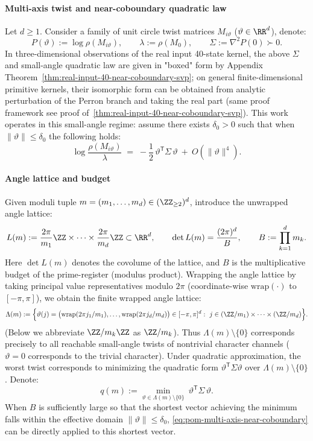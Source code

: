 \paragraph{Multi-axis twist and near-coboundary quadratic law}
Let $d\ge 1$.
Consider a family of unit circle twist matrices $M_{i\vartheta}$ ($\vartheta\in\RR^d$), denote:
\[
P(\vartheta):=\log\rho(M_{i\vartheta}),\qquad \lambda:=\rho(M_{0}),\qquad \Sigma:=\nabla^2P(0)\succ 0.
\]
In three-dimensional observations of the real input 40-state kernel, the above $\Sigma$ and small-angle quadratic law are given in "boxed" form by Appendix Theorem~\ref{thm:real-input-40-near-coboundary-svp}; on general finite-dimensional primitive kernels, their isomorphic form can be obtained from analytic perturbation of the Perron branch and taking the real part (same proof framework see proof of~\ref{thm:real-input-40-near-coboundary-svp}).
This work operates in this small-angle regime: assume there exists $\delta_0>0$ such that when $\|\vartheta\|\le \delta_0$ the following holds:
\begin{equation}\label{eq:pom-multi-axis-near-coboundary}
\log\frac{\rho(M_{i\vartheta})}{\lambda}
\;=\;
-\frac12\,\vartheta^{\mathsf T}\Sigma\,\vartheta\ +\ O(\|\vartheta\|^4).
\end{equation}

\paragraph{Angle lattice and budget}
Given moduli tuple $m=(m_1,\dots,m_d)\in(\ZZ_{\ge 2})^d$, introduce the unwrapped angle lattice:
\[
L(m):=\frac{2\pi}{m_1}\ZZ\times\cdots\times\frac{2\pi}{m_d}\ZZ\subset\RR^d,
\qquad
\det L(m)=\frac{(2\pi)^d}{B},
\qquad
B:=\prod_{k=1}^d m_k.
\]
Here $\det L(m)$ denotes the covolume of the lattice, and $B$ is the multiplicative budget of the prime-register (modulus product).
Wrapping the angle lattice by taking principal value representatives modulo $2\pi$ (coordinate-wise $\mathrm{wrap}(\cdot)$ to $[-\pi,\pi]$), we obtain the finite wrapped angle lattice:
\[
\Lambda(m):=\Bigl\{\vartheta(j)
=\bigl(\mathrm{wrap}(2\pi j_1/m_1),\dots,\mathrm{wrap}(2\pi j_d/m_d)\bigr)\in[-\pi,\pi]^d:\ j\in(\ZZ/m_1)\times\cdots\times(\ZZ/m_d)\Bigr\}.
\]
(Below we abbreviate $\ZZ/m_k\ZZ$ as $\ZZ/m_k$).
Thus $\Lambda(m)\setminus\{0\}$ corresponds precisely to all reachable small-angle twists of nontrivial character channels ($\vartheta=0$ corresponds to the trivial character).
Under quadratic approximation, the worst twist corresponds to minimizing the quadratic form $\vartheta^{\mathsf T}\Sigma\vartheta$ over $\Lambda(m)\setminus\{0\}$.
Denote:
\begin{equation}\label{eq:pom-multi-axis-qm}
q(m):=\min_{\vartheta\in\Lambda(m)\setminus\{0\}}\ \vartheta^{\mathsf T}\Sigma\,\vartheta.
\end{equation}
When $B$ is sufficiently large so that the shortest vector achieving the minimum falls within the effective domain $\|\vartheta\|\le\delta_0$, \eqref{eq:pom-multi-axis-near-coboundary} can be directly applied to this shortest vector.

